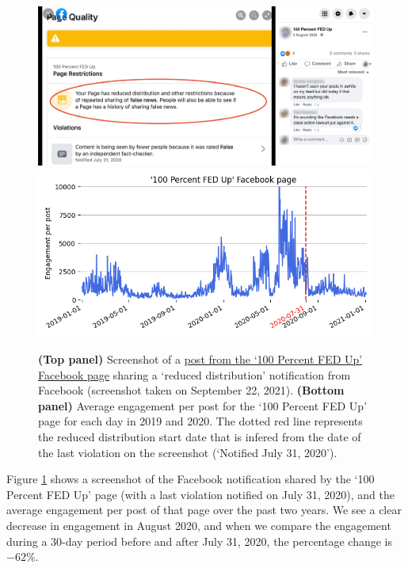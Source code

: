 \documentclass[review]{elsarticle}
\begin{document}
{\begin{figure}[!h]
\centering
\includegraphics[scale=0.15]{./../figure/reduce_example_screenshot.png}
\includegraphics[scale=0.5]{./../figure/reduce_example_timeseries.png}
\caption{
{\bf(Top panel)} Screenshot of a \href{https://www.facebook.com/100PercentFEDUp/photos/a.330374477016724/3201797096541100}{post from the `100 Percent FED Up' Facebook page} sharing a `reduced distribution' notification from Facebook (screenshot taken on September 22, 2021). 
{\bf(Bottom panel)} Average engagement per post for the `100 Percent FED Up' page for each day in 2019 and 2020.
The dotted red line represents the reduced distribution start date that is infered from the date of the last violation on the screenshot (`Notified July 31, 2020').
}
\label{reduce_example}
\end{figure}

Figure \ref{reduce_example} shows a screenshot of the Facebook notification shared by the `100 Percent FED Up' page (with a last violation notified on July 31, 2020), and the average engagement per post of that page over the past two years. 
We see a clear decrease in engagement in August 2020, and when we compare the engagement during a 30-day period before and after July 31, 2020, the percentage change is $-62\%$.

}
\end{document}
